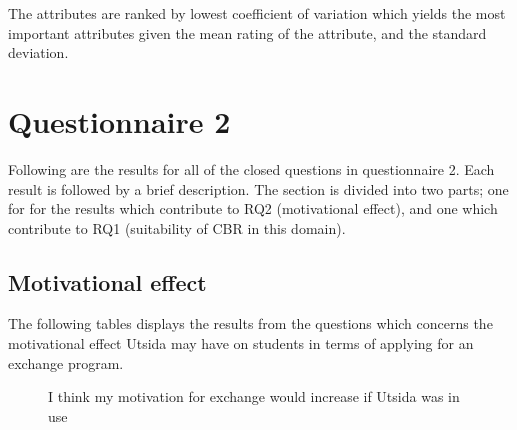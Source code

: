 The attributes are ranked by lowest coefficient of variation which yields the most important attributes given the mean rating of the attribute, and the standard deviation.

\section{Questionnaire 2}
Following are the results for all of the closed questions in questionnaire 2. Each result is followed by a brief description. The section is divided into two parts; one for for the results which contribute to RQ2 (motivational effect), and one which contribute to RQ1 (suitability of CBR in this domain).

\subsection{Motivational effect}

The following tables displays the results from the questions which concerns the motivational effect Utsida may have on students in terms of applying for an exchange program.

\begin{figure}[h]

    \centering
    
    
    \caption{I think my motivation for exchange would increase if Utsida was in use}
    \label{fig:test}
    
\end{figure}

